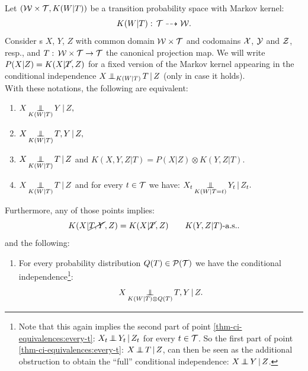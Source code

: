 \begin{Thm}
    \label{thm-ci-equivalences}
Let $(\mathcal{W} \times \mathcal{T}, K(W|T))$ be a transition probability space with Markov kernel:
\[K(W|T): \, \mathcal{T} \dashrightarrow  \mathcal{W}.\]
Consider \trv{}s $X$, $Y$, $Z$ with common domain $\mathcal{W}\times \mathcal{T}$ and codomains $\mathcal{X}$, 
$\mathcal{Y}$ and $\mathcal{Z}$, resp., and $T:\,\mathcal{W}\times \mathcal{T} \to \mathcal{T}$ the canonical projection map.
We will write $P(X|Z)=K(X|\cancel{T},Z)$ 
for a fixed version of the Markov kernel appearing in the conditional independence $X \operatorname*{\perp\mkern-11mu\perp}_{K(W|T)} T \operatorname*{|} Z$ (only in case it holds).\\
With these notations, the following are equivalent:
\begin{enumerate}
  \item $\displaystyle X \operatorname*{\perp\mkern-11mu\perp}_{K(W|T)} Y \operatorname*{|} Z,$ \label{thm-ci-equivalences:base}
    \item $\displaystyle X \operatorname*{\perp\mkern-11mu\perp}_{K(W|T)} T, Y \operatorname*{|} Z,$
    \item  $\displaystyle X \operatorname*{\perp\mkern-11mu\perp}_{K(W|T)} T \operatorname*{|} Z$ and  $ \displaystyle K(X,Y,Z|T) = P(X|Z) \otimes K(Y,Z|T)$.
    \item  $\displaystyle  X \operatorname*{\perp\mkern-11mu\perp}_{K(W|T)} T \operatorname*{|} Z$ and for every $t \in \mathcal{T}$ we have:
      $\displaystyle X_t \operatorname*{\perp\mkern-11mu\perp}_{K(W|T=t)} Y_t \operatorname*{|} Z_t.$ \label{thm-ci-equivalences:every-t}
\end{enumerate}
Furthermore, any of those points implies:
\[ K(X|\cancel{T,Y},Z) = K(X|\cancel{T},Z) \qquad K(Y,Z|T)\text{-a.s.}.\]
and the following:
\begin{enumerate}[resume]
    \item For every probability distribution $Q(T) \in \mathcal{P}(\mathcal{T})$ we have the conditional independence\footnote{Note that this again implies the second part of point \ref{thm-ci-equivalences:every-t}: $X_t \operatorname*{\perp\mkern-11mu\perp} Y_t \operatorname*{|} Z_t$ for every $t \in \mathcal{T}$. So the first part of point \ref{thm-ci-equivalences:every-t}: $X \operatorname*{\perp\mkern-11mu\perp} T \operatorname*{|} Z$, can then be seen as the additional obstruction to obtain the ``full'' conditional independence: $X \operatorname*{\perp\mkern-11mu\perp} Y \operatorname*{|} Z$.}:
      \[ X \operatorname*{\perp\mkern-11mu\perp}_{K(W|T)\otimes Q(T) } T,Y \operatorname*{|} Z.\] \label{thm-ci-equivalences:forall-Q}

\end{enumerate}
\end{Thm}
